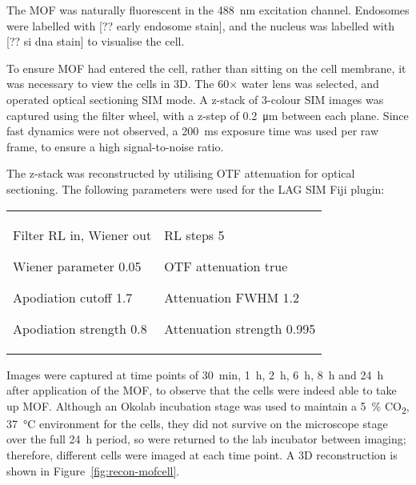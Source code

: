 The MOF was naturally fluorescent in the \SI{488}{\nano\metre} excitation channel. 
Endosomes were labelled with [?? early endosome stain], and the nucleus was labelled with [?? si dna stain] to visualise the cell. 

To ensure MOF had entered the cell, rather than sitting on the cell membrane, it was necessary to view the cells in 3D. 
The 60$\times$ water lens was selected, and operated optical sectioning SIM mode. 
A z-stack of 3-colour SIM images was captured using the filter wheel, with a z-step of \SI{0.2}{\micro\metre} between each plane. 
Since fast dynamics were not observed, a \SI{200}{\milli\second} exposure time was used per raw frame, to ensure a high signal-to-noise ratio. 

The z-stack was reconstructed by utilising OTF attenuation for optical sectioning. 
The following parameters were used for the LAG SIM Fiji plugin:\newline
\begin{tabular}{p{}p{}}
\begin{labelling}[margin={Attenuation strength}]
	\item[Filter] RL in, Wiener out
	\item[Wiener parameter] 0.05
	\item[Apodiation cutoff] 1.7
	\item[Apodiation strength] 0.8
\end{labelling} &
\begin{labelling}[margin={Attenuation strength}]
	\item[RL steps] 5
	\item[OTF attenuation] true
	\item[Attenuation FWHM] 1.2
	\item[Attenuation strength] 0.995 
\end{labelling} %
\end{tabular}

Images were captured at time points of \SI{30}{\minute}, \SI{1}{\hour}, \SI{2}{\hour}, \SI{6}{\hour}, \SI{8}{\hour} and \SI{24}{\hour} after application of the MOF, to observe that the cells were indeed able to take up MOF.
Although an Okolab incubation stage was used to maintain a \SI{5}{\percent} CO\textsubscript{2}, \SI{37}{\degreeCelsius} environment for the cells, they did not survive on the microscope stage over the full \SI{24}{\hour} period, so were returned to the lab incubator between imaging; therefore, different cells were imaged at each time point. 
A 3D reconstruction is shown in Figure~\ref{fig:recon-mofcell}. 

